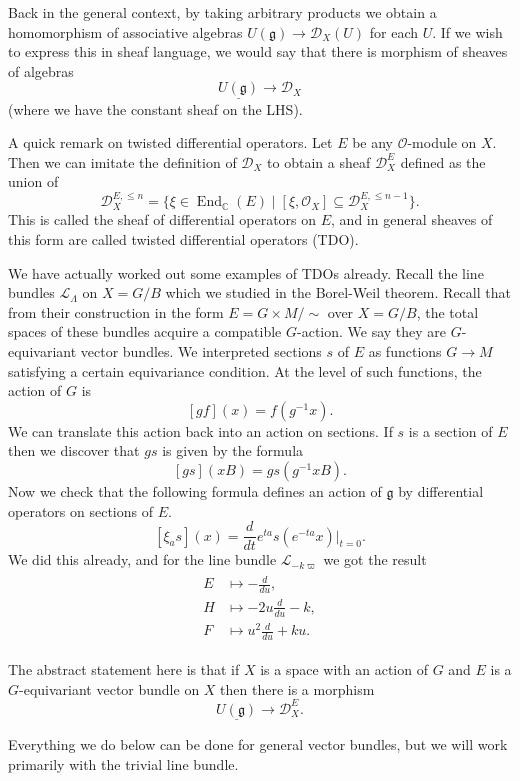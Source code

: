 \documentclass[12pt]{article}
\theoremstyle{plain}
\theoremstyle{definition}
\numberwithin{equation}{section}
\DeclareMathOperator{\en}{End}
\newcommand{\C}{\mathbb{C}}
\newcommand{\g}{\mathfrak{g}}
\newcommand{\CD}{\mathcal{D}}
\newcommand{\CL}{\mathcal{L}}
\newcommand{\OO}{\mathcal{O}}
\begin{document}
Back in the general context, by taking arbitrary products we obtain a homomorphism of associative algebras $U(\g) \rightarrow \CD_X(U)$ for each $U$. If we wish to express this in sheaf language, we would say that there is morphism of sheaves of algebras
\[
\underline{U(\g)} \rightarrow \CD_X
\]
(where we have the constant sheaf on the LHS).

A quick remark on twisted differential operators. Let $E$ be any $\OO$-module on $X$. Then we can imitate the definition of $\CD_X$ to obtain a sheaf $\CD_X^E$ defined as the union of
\[
\CD_X^{E, \leq n} = \{\xi \in \en_\C(E) \mid [\xi, \OO_X] \subseteq \CD_X^{E, \leq n-1}\}.
\]
This is called the sheaf of differential operators on $E$, and in general sheaves of this form are called twisted differential operators (TDO).

We have actually worked out some examples of TDOs already. Recall the line bundles $\CL_\Lambda$ on $X = G / B$ which we studied in the Borel-Weil theorem. Recall that from their construction in the form $E = G \times M / \sim$ over $X = G / B$, the total spaces of these bundles acquire a compatible $G$-action. We say they are $G$-equivariant vector bundles. We interpreted sections $s$ of $E$ as functions $G \rightarrow M$ satisfying a certain equivariance condition. At the level of such functions, the action of $G$ is
\[
[g f](x) = f(g^{-1}x).
\]
We can translate this action back into an action on sections. If $s$ is a section of $E$ then we discover that $g s$ is given by the formula
\[
[g s](xB) = g s(g^{-1} xB).
\]
Now we check that the following formula defines an action of $\g$ by differential operators on sections of $E$.
\[
[\xi_a s](x) = \frac{d}{dt} e^{ta} s(e^{-ta} x)|_{t=0}.
\]
We did this already, and for the line bundle $\CL_{-k\varpi}$ we got the result
\begin{align}\label{eq:TDO}
\begin{split}
E &\mapsto -\frac{d}{du}, \\
%
H &\mapsto -2u \frac{d}{du} - k, \\
%
F &\mapsto u^2 \frac{d}{du} + ku.
\end{split}
\end{align}

The abstract statement here is that if $X$ is a space with an action of $G$ and $E$ is a $G$-equivariant vector bundle on $X$ then there is a morphism
\[
\underline{U(\g)} \rightarrow \CD_X^E.
\]

Everything we do below can be done for general vector bundles, but we will work primarily with the trivial line bundle.
\end{document}
